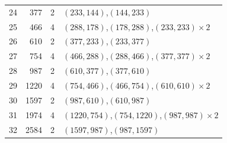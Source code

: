 \begin{table}[H]
\begin{tabular}{r r r l}
24 & 377 & 2 & $(233,144)$,\;$(144,233)$\\
25 & 466 & 4 & $(288,178)$,\;$(178,288)$,\;$(233,233)\times 2$\\
26 & 610 & 2 & $(377,233)$,\;$(233,377)$\\
27 & 754 & 4 & $(466,288)$,\;$(288,466)$,\;$(377,377)\times 2$\\
28 & 987 & 2 & $(610,377)$,\;$(377,610)$\\
29 & 1220 & 4 & $(754,466)$,\;$(466,754)$,\;$(610,610)\times 2$\\
30 & 1597 & 2 & $(987,610)$,\;$(610,987)$\\
31 & 1974 & 4 & $(1220,754)$,\;$(754,1220)$,\;$(987,987)\times 2$\\
32 & 2584 & 2 & $(1597,987)$,\;$(987,1597)$\\
\bottomrule
\end{tabular}
\end{table}
